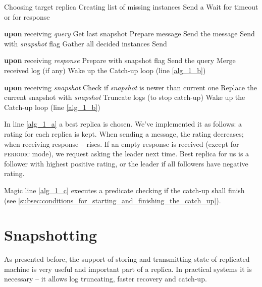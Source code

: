 \begin{algorithmic}[1]
  \REPEAT
    \STATE \label{alg_1_a} Choosing target replica
    \STATE Creating list of missing instances
    \STATE Send a \catchUpQuery
    \STATE \label{alg_1_b} Wait for timeout or for response
  
  \vspace{0.5em}
  
  \STATE \textbf{upon} receiving \catchUpQuery \textit{query}
      \STATE Get last snapshot
      \STATE Prepare \catchUpSnapshot message
      \STATE Send the message
      \STATE Send \catchUpResponse with \textit{snapshot} flag
    \ELSE
      \STATE Gather all decided instances
      \STATE Send \catchUpResponse
    \ENDIF

  \vspace{0.5em}
  \STATE \textbf{upon} receiving \catchUpResponse \textit{response}
      \STATE Prepare \catchUpQuery with snapshot flag
      \STATE Send the query
    \ELSE
      \STATE Merge received log (if any)
      \STATE Wake up the Catch-up loop (line \ref{alg_1_b})
    \ENDIF
  
  \vspace{0.5em}
  \STATE \textbf{upon} receiving \catchUpSnapshot \textit{snapshot}
  \STATE Check if \textit{snapshot} is newer than current one
  \STATE Replace the current snapshot with \textit{snapshot}
  \STATE Truncate logs (to stop catch-up)
  \STATE Wake up the Catch-up loop (line \ref{alg_1_b})

\end{algorithmic}

\vspace{1em}

In line \ref{alg_1_a} a best replica is chosen. We've implemented it as follows: a rating for each replica is kept. When sending a message, the rating decreases; when receiving response -- rises. If an empty response is received (except for \textsc{periodic} mode), we request asking the leader next time. Best replica for us is a follower with highest positive rating, or the leader if all followers have negative rating.

Magic line \ref{alg_1_c} executes a predicate checking if the catch-up shall finish (see \ref{subsec:conditions_for_starting_and_finishing_the_catch_up}).

\section{Snapshotting}
\label{sec:snapshotting}
As presented before, the support of storing and transmitting state of replicated machine is very useful and important part of a replica. In practical systems it is necessary -- it allows log truncating, faster recovery and catch-up.


